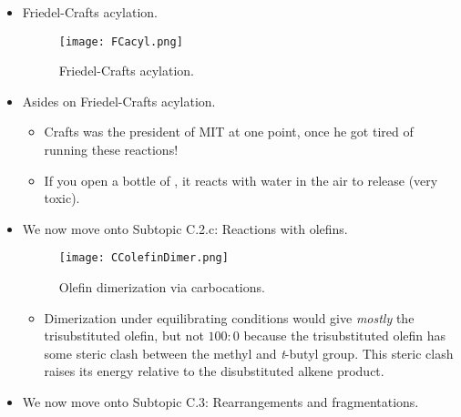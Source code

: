 \documentclass[../notes.tex]{subfiles}
\begin{document}
\begin{itemize}
\begin{figure}[H]
        \texttt{[image: Hock.png]}
        \caption{Hock process (stage 1).}
        \label{fig:Hock1}
    \end{figure}
    \begin{itemize}
        \item This is the primary method of producing acetone.\footnote{You can read more about this process --- called the \textbf{Hock process} --- on \href{https://en.wikipedia.org/wiki/Cumene_process}{Wikipedia}.}
        \item It astounds Prof. Buchwald that this is economical: Indeed, it's easier to attach the isopropyl group to benzene and then rip it apart again, then it is to convert it directly to acetone.
    \end{itemize}
    \item Friedel-Crafts acylation.
    \begin{figure}[h!]
        \centering
        \texttt{[image: FCacyl.png]}
        \caption{Friedel-Crafts acylation.}
        \label{fig:FCacyl}
    \end{figure}
    \item Asides on Friedel-Crafts acylation.
    \begin{itemize}
        \item Crafts was the president of MIT at one point, once he got tired of running these reactions!
        \item If you open a bottle of , it reacts with water in the air to release  (very toxic).
    \end{itemize}
    \item We now move onto Subtopic C.2.c{}: Reactions with olefins.
    \begin{figure}[h!]
        \centering
        \texttt{[image: CColefinDimer.png]}
        \caption{Olefin dimerization via carbocations.}
        \label{fig:CColefinDimer}
    \end{figure}
    \begin{itemize}
        \item Dimerization under equilibrating conditions would give \emph{mostly} the trisubstituted olefin, but not $100:0$ because the trisubstituted olefin has some steric clash between the methyl and \emph{t}-butyl group. This steric clash raises its energy relative to the disubstituted alkene product.
    \end{itemize}
    \item We now move onto Subtopic C.3: Rearrangements and fragmentations.

\end{itemize}
\end{document}
